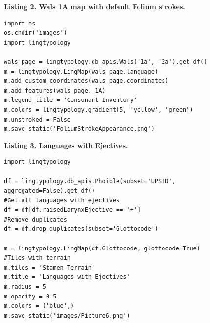 \documentclass[a4paper,12pt]{article}
\begin{document}
\textbf{Listing 2. Wals 1A map with default Folium strokes.}
\begin{lstlisting}
import os
os.chdir('images')
import lingtypology

wals_page = lingtypology.db_apis.Wals('1a', '2a').get_df()
m = lingtypology.LingMap(wals_page.language)
m.add_custom_coordinates(wals_page.coordinates)
m.add_features(wals_page._1A)
m.legend_title = 'Consonant Inventory'
m.colors = lingtypology.gradient(5, 'yellow', 'green')
m.unstroked = False
m.save_static('FoliumStrokeAppearance.png')
\end{lstlisting}
\bigskip

\textbf{Listing 3. Languages with Ejectives.}
\begin{lstlisting}
import lingtypology

df = lingtypology.db_apis.Phoible(subset='UPSID', aggregated=False).get_df()
#Get all languages with ejectives
df = df[df.raisedLarynxEjective == '+']
#Remove duplicates
df = df.drop_duplicates(subset='Glottocode')

m = lingtypology.LingMap(df.Glottocode, glottocode=True)
#Tiles with terrain
m.tiles = 'Stamen Terrain'
m.title = 'Languages with Ejectives'
m.radius = 5
m.opacity = 0.5
m.colors = ('blue',)
m.save_static('images/Picture6.png')
\end{lstlisting}
\end{document}
